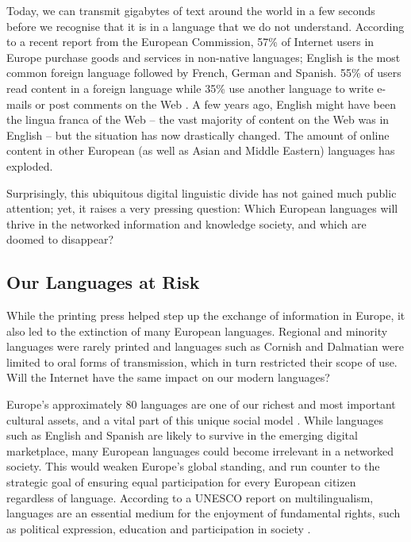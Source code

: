 \begin{multicols}{2}
  Today, we can transmit gigabytes of text around the world in a few seconds before we recognise that it is in a language that we do not understand. According to a recent report from the European Commission, 57\% of Internet users in Europe purchase goods and services in non-native languages; English is the most common foreign language followed by French, German and Spanish. 55\% of users read content in a foreign language while 35\% use another language to write e-mails or post comments on the Web \cite{EC1}. A few years ago, English might have been the lingua franca of the Web -- the vast majority of content on the Web was in English -- but the situation has now drastically changed. The amount of online content in other European (as well as Asian and Middle Eastern) languages has exploded.

  Surprisingly, this ubiquitous digital linguistic divide has not gained much public attention; yet, it raises a very pressing question: Which European languages will thrive in the networked information and knowledge society, and which are doomed to disappear?

  \subsection{Our Languages at Risk}

  While the printing press helped step up the exchange of information in Europe, it also led to the extinction of many European languages. Regional and minority languages were rarely printed and languages such as Cornish and Dalmatian were limited to oral forms of transmission, which in turn restricted their scope of use. Will the Internet have the same impact on our modern languages?


  Europe’s approximately 80 languages are one of our richest and most important cultural assets, and a vital part of this unique social model \cite{EC2}. While languages such as English and Spanish are likely to survive in the emerging digital marketplace, many European languages could become irrelevant in a networked society. This would weaken Europe’s global standing, and run counter to the strategic goal of ensuring equal participation for every European citizen regardless of language. According to a UNESCO report on multilingualism, languages are an essential medium for the enjoyment of fundamental rights, such as political expression, education and participation in society \cite{Unesco1}.


\end{multicols}
